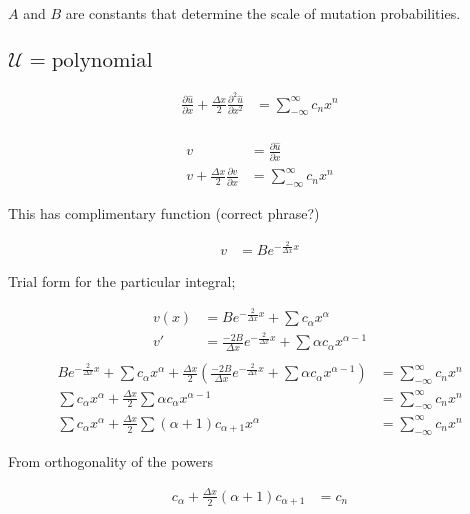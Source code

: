\documentclass[a4paper]{article}
\begin{document}
$A$ and $B$ are constants that determine the scale of mutation probabilities. 

\subsection{$\mathcal{U} = \text{polynomial}$ }

\begin{align*}
 \frac{\partial \hat{u}}{\partial x} + \frac{\Delta x}{2} \frac{\partial ^2 \hat{u}}{\partial x^2} & = \sum _{- \infty} ^{\infty} c_n x^n \\ 
\end{align*}

\begin{align*}
v & = \frac{\partial \hat{u}}{\partial x} \\
v + \frac{\Delta x }{2} \frac{\partial v}{\partial x} & =  \sum _{- \infty} ^{\infty} c_n x^n
\end{align*}

This has complimentary function (correct phrase?) 

\begin{align*}
v & = B e^{- \frac{2}{\Delta x} x}
\end{align*}

Trial form for the particular integral;

\begin{align*}
v(x) & = B e^{- \frac{2}{\Delta x} x} + \sum c_{\alpha } x^{\alpha } \\
v ' & = \frac{-2 B}{\Delta x} e^{- \frac{2}{\Delta x} x} + \sum \alpha c_{\alpha} x^{\alpha - 1} \\
\end{align*}
\begin{align*}
B e^{- \frac{2}{\Delta x} x} + \sum c_{\alpha } x^{\alpha } + \frac{\Delta x}{2} \left( \frac{-2 B}{\Delta x} e^{- \frac{2}{\Delta x} x} + \sum \alpha c_{\alpha} x^{\alpha - 1} \right) & = \sum _{- \infty} ^{\infty} c_n x^n \\
\sum c_{\alpha } x^{\alpha } + \frac{\Delta x}{2} \sum  \alpha c_{\alpha } x^{\alpha -1 } & = \sum _{- \infty} ^{\infty} c_n x^n \\
\sum c_{\alpha } x^{\alpha } + \frac{\Delta x}{2} \sum ( \alpha + 1 ) c_{\alpha + 1} x ^{\alpha } & = \sum _{- \infty} ^{\infty} c_n x^n
\end{align*}

From orthogonality of the powers

\begin{align*}
c_{\alpha } + \frac{\Delta x}{2} ( \alpha + 1 ) c_{\alpha + 1 } & = c _n
\end{align*}
\end{document}
